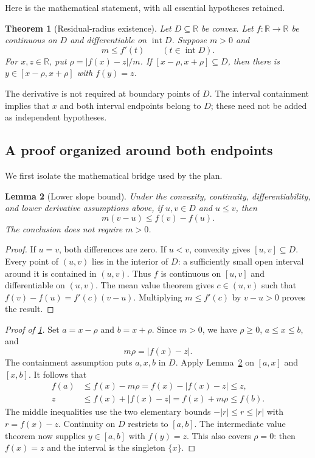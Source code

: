 \documentclass[11pt,a4paper]{article}
\newcommand{\R}{\mathbb R}
\newcommand{\interior}{\operatorname{int}}
\newtheorem{theorem}{Theorem}[section]
\newtheorem{lemma}[theorem]{Lemma}
\theoremstyle{definition}
\theoremstyle{remark}
\numberwithin{equation}{section}
\begin{document}
Here is the mathematical statement, with all essential hypotheses retained.
\begin{theorem}[Residual-radius existence]
\label{thm:residual}
Let $D\subseteq\R$ be convex. Let $f:\R\to\R$ be continuous on $D$ and differentiable on $\interior D$. Suppose $m>0$ and
\[
  m\le f'(t)\qquad(t\in\interior D).
\]
For $x,z\in\R$, put $\rho=|f(x)-z|/m$. If $[x-\rho,x+\rho]\subseteq D$, then there is $y\in[x-\rho,x+\rho]$ with $f(y)=z$.
\end{theorem}
The derivative is not required at boundary points of $D$. The interval containment implies that $x$ and both interval endpoints belong to $D$; these need not be added as independent hypotheses.

\subsection{A proof organized around both endpoints}
We first isolate the mathematical bridge used by the plan.
\begin{lemma}[Lower slope bound]
\label{lem:slope}
Under the convexity, continuity, differentiability, and lower derivative assumptions above, if $u,v\in D$ and $u\le v$, then
\begin{equation}\label{eq:slope}
 m(v-u)\le f(v)-f(u).
\end{equation}
The conclusion does not require $m>0$.
\end{lemma}
\begin{proof}
If $u=v$, both differences are zero. If $u<v$, convexity gives $[u,v]\subseteq D$. Every point of $(u,v)$ lies in the interior of $D$: a sufficiently small open interval around it is contained in $(u,v)$. Thus $f$ is continuous on $[u,v]$ and differentiable on $(u,v)$. The mean value theorem gives $c\in(u,v)$ such that $f(v)-f(u)=f'(c)(v-u)$. Multiplying $m\le f'(c)$ by $v-u>0$ proves the result.
\end{proof}

\begin{proof}[Proof of \cref{thm:residual}]
Set $a=x-\rho$ and $b=x+\rho$. Since $m>0$, we have $\rho\ge0$, $a\le x\le b$, and
\begin{equation}\label{eq:scale}
 m\rho=|f(x)-z|.
\end{equation}
The containment assumption puts $a,x,b$ in $D$. Apply Lemma~\ref{lem:slope} on $[a,x]$ and $[x,b]$. It follows that
\begin{align}
 f(a)&\le f(x)-m\rho=f(x)-|f(x)-z|\le z,\label{eq:leftbracket}\\
 z&\le f(x)+|f(x)-z|=f(x)+m\rho\le f(b).\label{eq:rightbracket}
\end{align}
The middle inequalities use the two elementary bounds
$-|r|\le r\le |r|$ with $r=f(x)-z$. Continuity on $D$ restricts to $[a,b]$. The intermediate value theorem now supplies $y\in[a,b]$ with $f(y)=z$. This also covers $\rho=0$: then $f(x)=z$ and the interval is the singleton $\{x\}$.
\end{proof}
\end{document}
